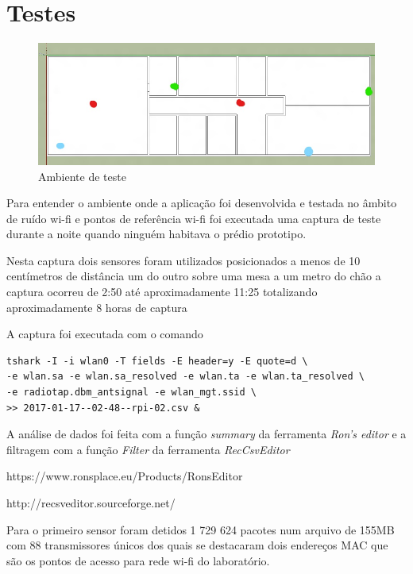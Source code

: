 \chapter{Testes}
\label{chap:Plataformas}


\begin{figure}[htb]
	\caption{\label{fig-modulos-esp}Ambiente de teste}
	\begin{center}
		\includegraphics[width=1\textwidth]{060-testes/data-analisis/planta-baixa_Ink_LI.jpg}
	\end{center}
\end{figure}


Para entender  o ambiente onde a aplicação foi desenvolvida e testada no âmbito
de ruído wi-fi e pontos de referência wi-fi foi executada uma captura de teste
durante a noite quando ninguém habitava o prédio prototipo.

Nesta captura dois sensores foram utilizados posicionados a menos de 10 centímetros
de distância um do outro sobre uma mesa a um metro do chão a captura ocorreu de 2:50
até aproximadamente 11:25 totalizando aproximadamente 8 horas de captura

A captura foi executada com o comando


\begin{verbatim}
tshark -I -i wlan0 -T fields -E header=y -E quote=d \
-e wlan.sa -e wlan.sa_resolved -e wlan.ta -e wlan.ta_resolved \
-e radiotap.dbm_antsignal -e wlan_mgt.ssid \
>> 2017-01-17--02-48--rpi-02.csv &
\end{verbatim}

A análise de dados foi feita com a função \emph{summary} da ferramenta \emph{Ron’s editor}
e a filtragem com a função \emph{Filter} da ferramenta \emph{RecCsvEditor}

https://www.ronsplace.eu/Products/RonsEditor

http://recsveditor.sourceforge.net/

Para o primeiro sensor foram detidos 1 729 624 pacotes num arquivo de 155MB
com 88 transmissores únicos dos quais se destacaram dois endereços MAC que são os
pontos de acesso para rede wi-fi do laboratório.


